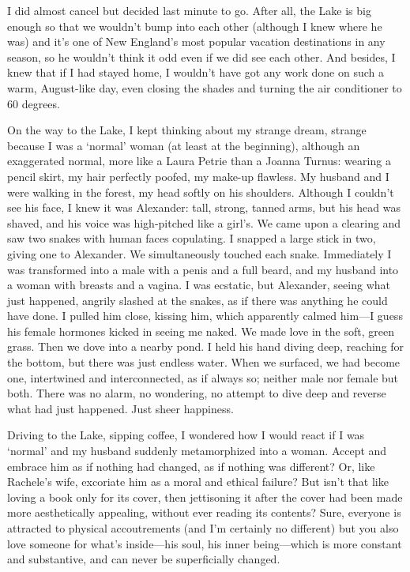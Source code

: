 I did almost cancel but decided last minute to go. After all, the Lake
is big enough so that we wouldn't bump into each other (although I knew
where he was) and it's one of New England's most popular vacation
destinations in any season, so he wouldn't think it odd even if we did
see each other. And besides, I knew that if I had stayed home, I
wouldn't have got any work done on such a warm, August-like day, even
closing the shades and turning the air conditioner to 60 degrees.

On the way to the Lake, I kept thinking about my strange dream, strange
because I was a `normal' woman (at least at the beginning), although an
exaggerated normal, more like a Laura Petrie than a Joanna Turnus:
wearing a pencil skirt, my hair perfectly poofed, my make-up flawless.
My husband and I were walking in the forest, my head softly on his
shoulders. Although I couldn't see his face, I knew it was Alexander:
tall, strong, tanned arms, but his head was shaved, and his voice was
high-pitched like a girl's. We came upon a clearing and saw two snakes
with human faces copulating. I snapped a large stick in two, giving one
to Alexander. We simultaneously touched each snake. Immediately I was
transformed into a male with a penis and a full beard, and my husband
into a woman with breasts and a vagina. I was ecstatic, but Alexander,
seeing what just happened, angrily slashed at the snakes, as if there
was anything he could have done. I pulled him close, kissing him, which
apparently calmed him---I guess his female hormones kicked in seeing me
naked. We made love in the soft, green grass. Then we dove into a nearby
pond. I held his hand diving deep, reaching for the bottom, but there
was just endless water. When we surfaced, we had become one, intertwined
and interconnected, as if always so; neither male nor female but both.
There was no alarm, no wondering, no attempt to dive deep and reverse
what had just happened. Just sheer happiness.

Driving to the Lake, sipping coffee, I wondered how I would react if I
was `normal' and my husband suddenly metamorphized into a woman. Accept
and embrace him as if nothing had changed, as if nothing was different?
Or, like Rachele's wife, excoriate him as a moral and ethical failure?
But isn't that like loving a book only for its cover, then jettisoning
it after the cover had been made more aesthetically appealing, without
ever reading its contents? Sure, everyone is attracted to physical
accoutrements (and I'm certainly no different) but you also love someone
for what's inside---his soul, his inner being---which is more constant
and substantive, and can never be superficially changed.

